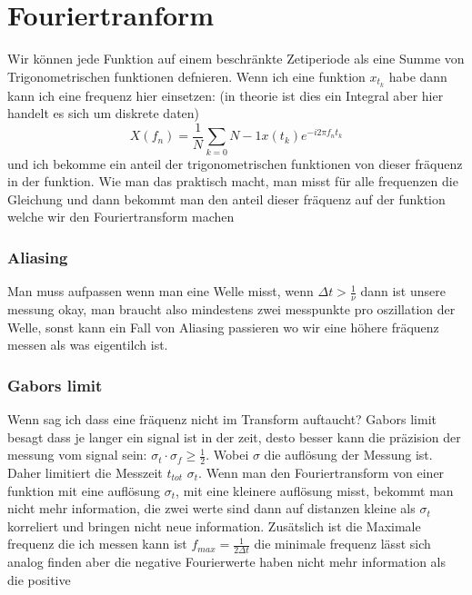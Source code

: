 \documentclass{article}
\begin{document}
\section{Fouriertranform}
Wir können jede Funktion auf einem beschränkte Zetiperiode als eine Summe von Trigonometrischen funktionen defnieren. Wenn ich eine funktion $x_{t_k}$ habe dann kann ich eine frequenz hier einsetzen: (in theorie ist dies ein Integral aber hier handelt es sich um diskrete daten)
\[X(f_n)=\frac{1}{N}\sum_{k=0}{N-1}x(t_k)e^{-i2\pi f_nt_k}\]
und ich bekomme ein anteil der trigonometrischen funktionen von dieser fräquenz in der funktion.\newline
Wie man das praktisch macht, man misst für alle frequenzen die Gleichung und dann bekommt man den anteil dieser fräquenz auf der funktion welche wir den Fouriertransform machen
\subsubsection{Aliasing} Man muss aufpassen wenn man eine Welle misst, wenn $\Delta t>\frac{1}{\nu}$ dann ist unsere messung okay, man braucht also mindestens zwei messpunkte pro oszillation der Welle, sonst kann ein Fall von Aliasing passieren wo wir eine höhere fräquenz messen als was eigentilch ist.
\subsubsection{Gabors limit} Wenn sag ich dass eine fräquenz nicht im Transform auftaucht? Gabors limit besagt dass je langer ein signal ist in der zeit, desto besser kann die präzision der messung vom signal sein: $\sigma_t\cdot\sigma_f\ge\frac{1}{2}$. Wobei $\sigma$ die auflösung der Messung ist.
Daher limitiert die Messzeit $t_{tot}$ $\sigma_t$. Wenn man den Fouriertransform von einer funktion mit eine auflösung $\sigma_t$, mit eine kleinere auflösung misst, bekommt man nicht mehr information, die zwei werte sind dann auf distanzen kleine als $\sigma_t$ korreliert und bringen nicht neue information.
Zusätslich ist die Maximale frequenz die ich messen kann ist $f_{max}=\frac{1}{2\Delta t}$ die minimale frequenz lässt sich analog finden aber die negative Fourierwerte haben nicht mehr information als die positive
\end{document}
